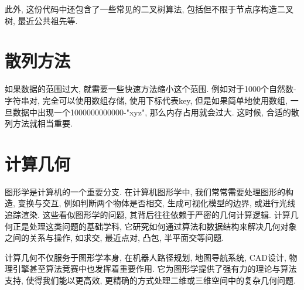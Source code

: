 \documentclass[a4paper]{ctexart}
\begin{document}
此外, 这份代码中还包含了一些常见的二叉树算法, 包括但不限于节点序构造二叉树, 最近公共祖先等.



\section{散列方法}

如果数据的范围过大, 就需要一些快速方法缩小这个范围. 例如对于1000个自然数-字符串对, 完全可以使用数组存储, 使用下标代表key, 但是如果简单地使用数组, 一旦数据中出现一个1000000000000-"xyz", 那么内存占用就会过大. 这时候, 合适的散列方法就相当重要.



\section{计算几何}

图形学是计算机的一个重要分支. 在计算机图形学中, 我们常常需要处理图形的构造, 变换与交互, 例如判断两个物体是否相交, 生成可视化模型的边界, 或进行光线追踪渲染. 这些看似图形学的问题, 其背后往往依赖于严密的几何计算逻辑. 计算几何正是处理这类问题的基础学科, 它研究如何通过算法和数据结构来解决几何对象之间的关系与操作, 如求交, 最近点对, 凸包, 半平面交等问题.

计算几何不仅服务于图形学本身, 在机器人路径规划, 地图导航系统, CAD设计, 物理引擎甚至算法竞赛中也发挥着重要作用. 它为图形学提供了强有力的理论与算法支持, 使得我们能以更高效, 更精确的方式处理二维或三维空间中的复杂几何问题.


\end{document}
